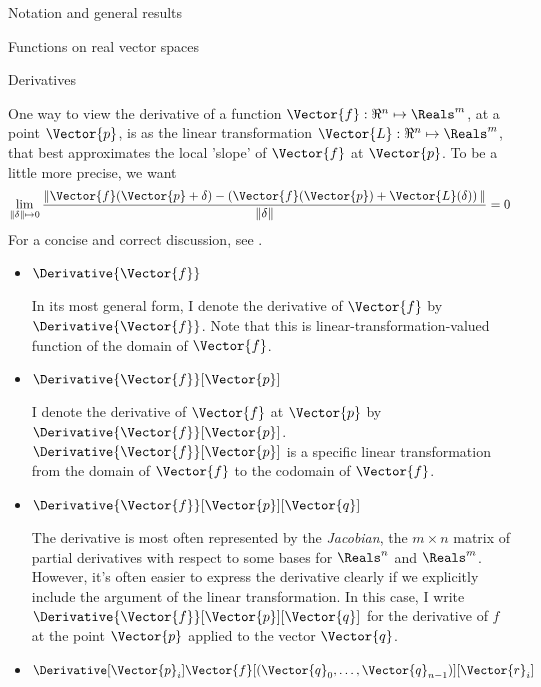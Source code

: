 \begin{plSection}{Notation and general results}
\begin{plSection}{Functions on real vector spaces}
\end{plSection}%
\begin{plSection}{Derivatives}
\label{sec:derivatives}

One way to view the derivative of a function
$\Vector{f}:{\Re}^{n} \mapsto \Reals^{m}$,
at a point $\Vector{p}$,
is as the linear transformation 
$\Vector{L}:{\Re}^{n} \mapsto \Reals^{m}$,
that best approximates the local 'slope' of 
$\Vector{f}$ at $\Vector{p}$.
To be a little more precise, we want
\begin{displaymath}
\lim_{ \|\delta\| \mapsto 0}
\frac{\|
\Vector{f}(\Vector{p} + \delta) 
- \left( \Vector{f}(\Vector{p}) + \Vector{L}(\delta) \right) 
\|}
{\|\delta\|}
 = 0
\end{displaymath}
For a concise and correct discussion, see .

\begin{itemize}

\item $\Derivative{\Vector{f}}$

In its most general form,
I denote the derivative of $\Vector{f}$ 
by $\Derivative{\Vector{f}}$.
Note that this is
linear-transformation-valued function 
of the domain of $\Vector{f}$.

\item $\Derivative{\Vector{f}}[\Vector{p}]$

I denote the derivative of $\Vector{f}$ 
at $\Vector{p}$ by $\Derivative{\Vector{f}}[\Vector{p}]$.
$\Derivative{\Vector{f}}[\Vector{p}]$ 
is a specific linear transformation from
the domain of $\Vector{f}$ to the codomain of $\Vector{f}$.

\item $\Derivative{\Vector{f}}[\Vector{p}][\Vector{q}]$

The derivative is most often represented by the {\it Jacobian},
the $m \times n$ matrix of partial derivatives
with respect to some bases for $\Reals^n$ and $\Reals^m$.
However, it's often easier to express the derivative clearly if we
explicitly include the argument of the linear transformation.
In this case, I write $\Derivative{\Vector{f}}[\Vector{p}][\Vector{q}]$
for the derivative of $f$ at the point $\Vector{p}$
applied to the vector $\Vector{q}$.

\item $\Derivative[\Vector{p}_i]
{\Vector{f}}
[(\Vector{q}_0,\ldots,\Vector{q}_{n-1})]
[\Vector{r}_i]$


\end{itemize}
\end{plSection}
\end{plSection}
